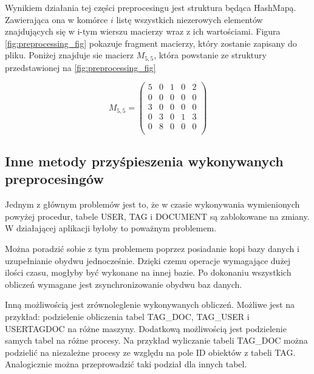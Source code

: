 Wynikiem działania tej części preprocesingu jest struktura będąca HashMapą. Zawierająca ona w komórce $i$ listę wszystkich niezerowych elementów znajdujących się w i-tym wierszu macierzy wraz z ich wartościami. Figura \ref{fig:preprocessing_fig} pokazuje fragment macierzy, który zostanie zapisany do pliku. Poniżej znajduje sie macierz $M_{5,5}$, która powstanie ze struktury przedstawionej na \ref{fig:preprocessing_fig}


\[
 M_{5,5} =
 \begin{pmatrix}
5 & 0 & 1 & 0 & 2\\
0 & 0 & 0 & 0 & 0\\
3 & 0 & 0 & 0 & 0\\
0 & 3 & 0 & 1 & 3\\
0 & 8 & 0 & 0 & 0\\

 \end{pmatrix}
\]


\subsection{Inne metody przyśpieszenia wykonywanych preprocesingów}

Jednym z głównym problemów jest to, że w czasie wykonywania wymienionych powyżej procedur, tabele USER, TAG i DOCUMENT są zablokowane na zmiany. W działającej aplikacji byłoby to poważnym problemem.  

Można poradzić sobie z tym problemem poprzez posiadanie kopi bazy danych i uzupełnianie obydwu jednocześnie. Dzięki czemu operacje wymagające dużej ilości czasu, mogłyby być wykonane na innej bazie. Po dokonaniu wszystkich obliczeń wymagane jest zsynchronizowanie obydwu baz danych.

Inną możliwością jest zrównoleglenie wykonywanych obliczeń. Możliwe jest na przykład: podzielenie obliczenia tabel TAG\_DOC, TAG\_USER i USERTAGDOC na różne maszyny. Dodatkową możliwością jest podzielenie samych tabel na różne procesy. Na przykład wyliczanie tabeli TAG\_DOC można podzielić na niezależne procesy ze względu na pole ID obiektów z tabeli TAG. Analogicznie można przeprowadzić taki podział dla innych tabel.

